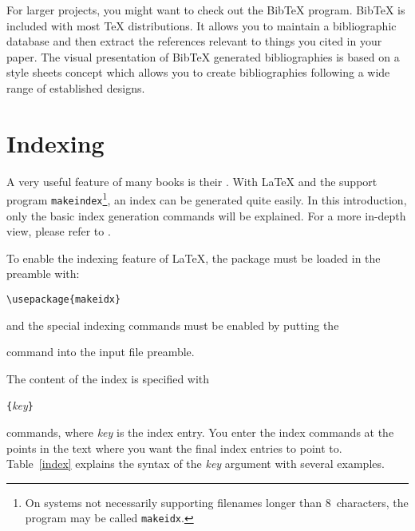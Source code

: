 \thispagestyle{fancyplain}

\newpage

For larger projects, you might want to check out the Bib\TeX{}
program. Bib\TeX{} is included with most \TeX{} distributions. It
allows you to maintain a bibliographic database and then extract the
references relevant to things you cited in your paper. The visual
presentation of Bib\TeX{} generated bibliographies is based on a style
sheets concept which allows you to create bibliographies following
a wide range of established designs.

\section{Indexing} \label{sec:indexing}
A very useful feature of many books is their . With \LaTeX{}
and the support program \texttt{makeindex}\footnote{On systems not
  necessarily supporting
  filenames longer than 8~characters, the program may be called
  \texttt{makeidx}.}, an index can be generated quite easily.  In this
introduction, only the basic index generation commands will be explained.
For a more in-depth view, please refer to \companion.   

To enable the indexing feature of \LaTeX{}, the  package
must be loaded in the preamble with:
\begin{lscommand}
\verb|\usepackage{makeidx}|
\end{lscommand}
\noindent and the special indexing commands must be enabled by putting 
the
\begin{lscommand}
\end{lscommand}
\noindent command into the input file preamble.

The content of the index is specified with
\begin{lscommand}
  \verb|{|\emph{key}\verb|}|
\end{lscommand}
\noindent commands, where \emph{key} is the index entry. You enter the
index commands at the points in the text where you want the final index
entries to point to.  Table~\ref{index} explains the syntax of the
\emph{key} argument with several examples.

